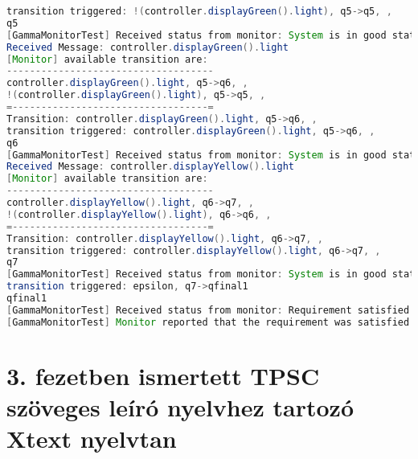 \begin{lstlisting}[language=java, caption={\textit{Gamma} monitor kimenet rendőrségi példa.},captionpos=b,label=gamma_monitor_output2]
transition triggered: !(controller.displayGreen().light), q5->q5, ,
q5
[GammaMonitorTest] Received status from monitor: System is in good state.
Received Message: controller.displayGreen().light
[Monitor] available transition are:
------------------------------------
controller.displayGreen().light, q5->q6, ,
!(controller.displayGreen().light), q5->q5, ,
=----------------------------------=
Transition: controller.displayGreen().light, q5->q6, ,
transition triggered: controller.displayGreen().light, q5->q6, ,
q6
[GammaMonitorTest] Received status from monitor: System is in good state.
Received Message: controller.displayYellow().light
[Monitor] available transition are:
------------------------------------
controller.displayYellow().light, q6->q7, ,
!(controller.displayYellow().light), q6->q6, ,
=----------------------------------=
Transition: controller.displayYellow().light, q6->q7, ,
transition triggered: controller.displayYellow().light, q6->q7, ,
q7
[GammaMonitorTest] Received status from monitor: System is in good state.
transition triggered: epsilon, q7->qfinal1
qfinal1
[GammaMonitorTest] Received status from monitor: Requirement satisfied
[GammaMonitorTest] Monitor reported that the requirement was satisfied    
\end{lstlisting}

\section{3. fezetben ismertett TPSC szöveges leíró nyelvhez tartozó Xtext nyelvtan}

